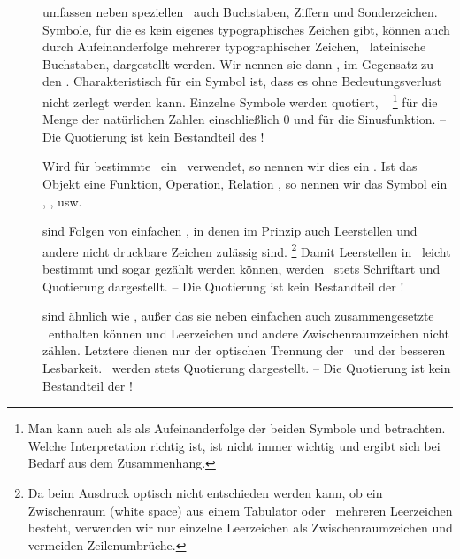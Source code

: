 \begin{description}

	\item [\Symbole] umfassen neben speziellen \Symbolen\ auch Buchstaben, Ziffern und Sonderzeichen.
	Symbole, für die es kein eigenes typographisches Zeichen gibt, können auch durch Aufeinanderfolge mehrerer typographischer Zeichen, \textiAlg\ lateinische Buchstaben, dargestellt werden.
	Wir nennen sie dann , im Gegensatz zu den .
	Charakteristisch für ein Symbol ist, dass es ohne Bedeutungsverlust nicht zerlegt werden kann.
	Einzelne Symbole werden  quotiert, \textzB\ \chrqt{$\gsNo$}%
	\footnote{%
		Man kann \chrqt{$\gsNo$} auch als als Aufeinanderfolge der beiden Symbole \chrqt{$\gsN$} und  betrachten.
		Welche Interpretation richtig ist, ist nicht immer wichtig und ergibt sich bei Bedarf aus dem Zusammenhang.
	}
	für die Menge der natürlichen Zahlen einschließlich 0 und \chrqt{$\sin$} für die Sinusfunktion.
	-- Die Quotierung ist kein Bestandteil des \Symbols!

	Wird für bestimmte \Objekte\ ein \Symbol\ verwendet, so nennen wir dies ein .
	Ist das Objekt eine Funktion, Operation, Relation \textusw, so nennen wir das Symbol ein , ,  usw.

	\item [\Zeichenketten] sind Folgen von einfachen \Symbolen, in denen im Prinzip auch Leerstellen und andere nicht druckbare Zeichen zulässig sind.%
	\footnote{%
		Da beim Ausdruck optisch nicht entschieden werden kann, ob ein Zwischenraum (white space) aus einem Tabulator oder \textevtl\ mehreren Leerzeichen besteht, verwenden wir nur einzelne Leerzeichen als Zwischenraumzeichen und vermeiden Zeilenumbrüche.
	}
	Damit Leerstellen in \Zeichenketten\ leicht bestimmt und sogar gezählt werden können,
	werden \Zeichenketten\ stets  Schriftart und Quotierung dargestellt.
	-- Die Quotierung ist kein Bestandteil der \Zeichenkette!

	\item [\Zeichenfolgen] sind ähnlich wie \Zeichenketten, außer das sie neben einfachen auch zusammengesetzte \Symbole\ enthalten können und Leerzeichen und andere Zwischenraumzeichen nicht zählen.
	Letztere dienen nur der optischen Trennung der \Symbole\ und der besseren Lesbarkeit.
	\Zeichenfolgen\ werden stets  Quotierung dargestellt.
	-- Die Quotierung ist kein Bestandteil der \Zeichenfolge!


\end{description}
